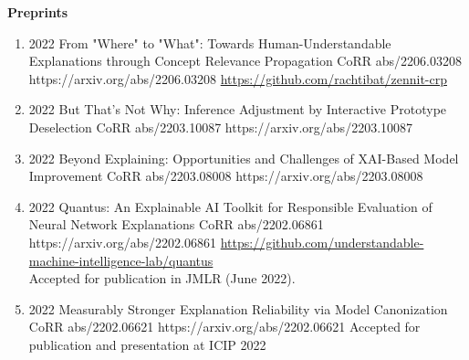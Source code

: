 \documentclass[10pt,a4paper]{article} %
\begin{document}
\headedsection %
{\bf Preprints}{}
{
    \begin{enumerate}

        \item {}
                        {2022}
                        {From "Where" to "What": Towards Human-Understandable Explanations through Concept Relevance Propagation}
                        {CoRR abs/2206.03208}
                        {https://arxiv.org/abs/2206.03208}
                        {\href{https://github.com/rachtibat/zennit-crp}{https://github.com/rachtibat/zennit-crp}}

        \item {}
                            {2022}
                            {But That's Not Why: Inference Adjustment by Interactive Prototype Deselection}
                            {CoRR abs/2203.10087}
                            {https://arxiv.org/abs/2203.10087}

        \item {}
                            {2022}
                            {Beyond Explaining: Opportunities and Challenges of XAI-Based Model Improvement}
                            {CoRR abs/2203.08008}
                            {https://arxiv.org/abs/2203.08008}

        \item {}
                            {2022}
                            {Quantus: An Explainable AI Toolkit for Responsible Evaluation of Neural Network Explanations}
                            {CoRR abs/2202.06861}
                            {https://arxiv.org/abs/2202.06861}
                            {\href{https://github.com/understandable-machine-intelligence-lab/quantus}{https://github.com/understandable-machine-intelligence-lab/quantus}\\
                            Accepted for publication in JMLR (June 2022).
                            }

        \item {}
                            {2022}
                            {Measurably Stronger Explanation Reliability via Model Canonization}
                            {CoRR abs/2202.06621}
                            {https://arxiv.org/abs/2202.06621}
                            {Accepted for publication and presentation at ICIP 2022}


\end{enumerate}}
\end{document}
